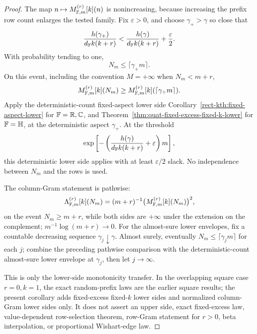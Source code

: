 \begin{proof}
The map \(n\mapsto M_{\mathbb{F},m}^{(r)}[k](n)\) is nonincreasing, because increasing
the prefix row count enlarges the tested family.  Fix \(\varepsilon>0\), and
choose \(\gamma_+>\gamma\) so close that
\[
  \frac{h(\gamma_+)}{d_{\mathbb{F}} k(k+r)}
  <
  \frac{h(\gamma)}{d_{\mathbb{F}} k(k+r)}+\frac{\varepsilon}{2}.
\]
With probability tending to one,
\[
  N_m\le \lceil\gamma_+m\rceil .
\]
On this event, including the convention \(M=+\infty\) when \(N_m<m+r\),
\[
  M_{\mathbb{F},m}^{(r)}[k](N_m)
  \ge M_{\mathbb{F},m}^{(r)}[k](\lceil\gamma_+m\rceil).
\]
Apply the deterministic-count fixed-aspect lower side
Corollary~\ref{rect-kth:fixed-aspect-lower} for \(\mathbb{F}=\mathbb{R},\mathbb{C}\), and
Theorem~\ref{thm:quat-fixed-excess-fixed-k-lower} for \(\mathbb{F}=\mathbb{H}\), at the
deterministic aspect \(\gamma_+\).  At the threshold
\[
  \exp\left[-\left(\frac{h(\gamma)}{d_{\mathbb{F}} k(k+r)}+\varepsilon\right)m\right],
\]
this deterministic lower side applies with at least \(\varepsilon/2\) slack.
No independence between \(N_m\) and the rows is used.

The column-Gram statement is pathwise:
\[
  \Lambda_{\mathbb{F},m}^{(r)}[k](N_m)
  =(m+r)^{-1}\bigl(M_{\mathbb{F},m}^{(r)}[k](N_m)\bigr)^2,
\]
on the event \(N_m\ge m+r\), while both sides are \(+\infty\) under the
extension on the complement; \(m^{-1}\log(m+r)\to0\).  For the almost-sure
lower envelopes, fix a countable decreasing sequence \(\gamma_j\downarrow\gamma\).
Almost surely, eventually \(N_m\le\lceil\gamma_jm\rceil\) for each \(j\);
combine the preceding pathwise comparison with the deterministic-count
almost-sure lower envelope at \(\gamma_j\), then let \(j\to\infty\).

This is only the lower-side monotonicity transfer.  In the overlapping square
case \(r=0,k=1\), the exact random-prefix laws are the earlier square results;
the present corollary adds fixed-excess fixed-\(k\) lower sides and normalized
column-Gram lower sides only.  It does not assert an upper side, exact
fixed-excess law, value-dependent row-selection theorem, row-Gram statement for
\(r>0\), beta interpolation, or proportional Wishart-edge law.
\end{proof}


